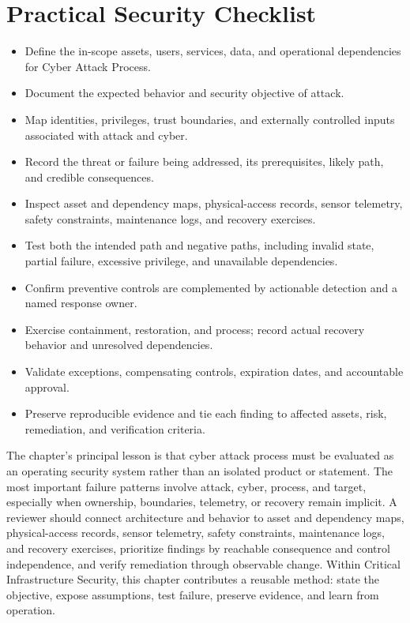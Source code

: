 \documentclass[11pt]{article}
\begin{document}
\section*{Practical Security Checklist}
\begin{itemize}[label=$\square$]
\item Define the in-scope assets, users, services, data, and operational dependencies for Cyber Attack Process.
\item Document the expected behavior and security objective of attack.
\item Map identities, privileges, trust boundaries, and externally controlled inputs associated with attack and cyber.
\item Record the threat or failure being addressed, its prerequisites, likely path, and credible consequences.
\item Inspect asset and dependency maps, physical-access records, sensor telemetry, safety constraints, maintenance logs, and recovery exercises.
\item Test both the intended path and negative paths, including invalid state, partial failure, excessive privilege, and unavailable dependencies.
\item Confirm preventive controls are complemented by actionable detection and a named response owner.
\item Exercise containment, restoration, and process; record actual recovery behavior and unresolved dependencies.
\item Validate exceptions, compensating controls, expiration dates, and accountable approval.
\item Preserve reproducible evidence and tie each finding to affected assets, risk, remediation, and verification criteria.
\end{itemize}
\begin{synthesisbox}
The chapter's principal lesson is that cyber attack process must be evaluated as an operating security system rather than an isolated product or statement. The most important failure patterns involve attack, cyber, process, and target, especially when ownership, boundaries, telemetry, or recovery remain implicit. A reviewer should connect architecture and behavior to asset and dependency maps, physical-access records, sensor telemetry, safety constraints, maintenance logs, and recovery exercises, prioritize findings by reachable consequence and control independence, and verify remediation through observable change. Within Critical Infrastructure Security, this chapter contributes a reusable method: state the objective, expose assumptions, test failure, preserve evidence, and learn from operation.
\end{synthesisbox}
\end{document}
